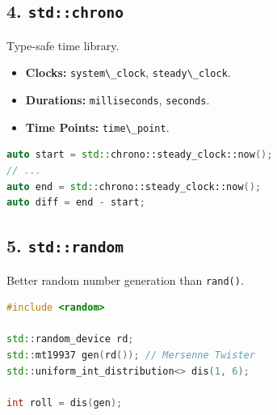 \hypertarget{stdchrono}{%
\subsection{\texorpdfstring{4.
\texttt{std::chrono}}{4. std::chrono}}\label{stdchrono}}

Type-safe time library.

\begin{itemize}
\tightlist
\item
  \textbf{Clocks:} \passthrough{\lstinline!system\_clock!},
  \passthrough{\lstinline!steady\_clock!}.
\item
  \textbf{Durations:} \passthrough{\lstinline!milliseconds!},
  \passthrough{\lstinline!seconds!}.
\item
  \textbf{Time Points:} \passthrough{\lstinline!time\_point!}.
\end{itemize}

\begin{lstlisting}[language={C++}]
auto start = std::chrono::steady_clock::now();
// ...
auto end = std::chrono::steady_clock::now();
auto diff = end - start;
\end{lstlisting}

\hypertarget{stdrandom}{%
\subsection{\texorpdfstring{5.
\texttt{std::random}}{5. std::random}}\label{stdrandom}}

Better random number generation than \passthrough{\lstinline!rand()!}.

\begin{lstlisting}[language={C++}]
#include <random>

std::random_device rd;
std::mt19937 gen(rd()); // Mersenne Twister
std::uniform_int_distribution<> dis(1, 6);

int roll = dis(gen);
\end{lstlisting}
